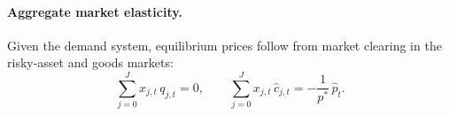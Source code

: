 



\paragraph{Aggregate market elasticity.}  
Given the demand system, equilibrium prices follow from market clearing in the risky-asset and goods markets:
\[
    \sum_{j=0}^J x_{j,t}\, q_{j,t} = 0,
    \qquad
    \sum_{j=0}^J x_{j,t}\, \hat{c}_{j,t} = -\frac{1}{p^*}\,\hat{p}_t .
\]

